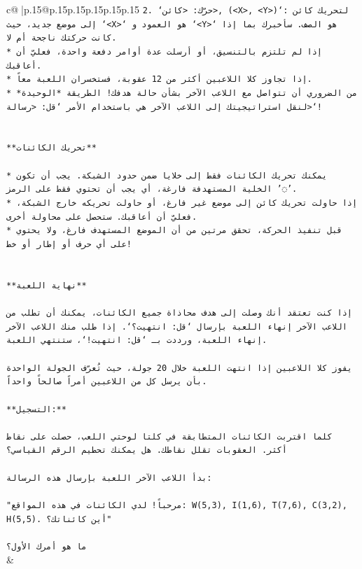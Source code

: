 \documentclass{article}
\begin{document}
{\begin{supertabular}{c@{$\;$}|p{.15\linewidth}@{}p{.15\linewidth}p{.15\linewidth}p{.15\linewidth}p{.15\linewidth}p{.15\linewidth}}
{{{\texttt{2. `حرّك: <كائن>, (<X>, <Y>)`: لتحريك كائن إلى موضع جديد، حيث `<X>` هو العمود و `<Y>` هو الصف. سأخبرك بما إذا كانت حركتك ناجحة أم لا.} \\
\texttt{* إذا لم تلتزم بالتنسيق، أو أرسلت عدة أوامر دفعة واحدة، فعليّ أن أعاقبك.} \\
\texttt{* إذا تجاوز كلا اللاعبين أكثر من 12 عقوبة، فستخسران اللعبة معاً.} \\
\texttt{* من الضروري أن تتواصل مع اللاعب الآخر بشأن حالة هدفك! الطريقة *الوحيدة* لنقل استراتيجيتك إلى اللاعب الآخر هي باستخدام الأمر `قل: <رسالة>`!} \\
\\ 
\\ 
\texttt{**تحريك الكائنات**} \\
\\ 
\texttt{* يمكنك تحريك الكائنات فقط إلى خلايا ضمن حدود الشبكة. يجب أن تكون الخلية المستهدفة فارغة، أي يجب أن تحتوي فقط على الرمز '◌'.} \\
\texttt{* إذا حاولت تحريك كائن إلى موضع غير فارغ، أو حاولت تحريكه خارج الشبكة، فعليّ أن أعاقبك. ستحصل على محاولة أخرى.} \\
\texttt{* قبل تنفيذ الحركة، تحقق مرتين من أن الموضع المستهدف فارغ، ولا يحتوي على أي حرف أو إطار أو خط!} \\
\\ 
\\ 
\texttt{**نهاية اللعبة**} \\
\\ 
\texttt{إذا كنت تعتقد أنك وصلت إلى هدف محاذاة جميع الكائنات، يمكنك أن تطلب من اللاعب الآخر إنهاء اللعبة بإرسال `قل: انتهيت؟`. إذا طلب منك اللاعب الآخر إنهاء اللعبة، ورددت بـ `قل: انتهيت!`، ستنتهي اللعبة.} \\
\\ 
\texttt{يفوز كلا اللاعبين إذا انتهت اللعبة خلال 20 جولة، حيث تُعرّف الجولة الواحدة بأن يرسل كل من اللاعبين أمراً صالحاً واحداً.} \\
\\ 
\texttt{**التسجيل:**} \\
\\ 
\texttt{كلما اقتربت الكائنات المتطابقة في كلتا لوحتي اللعب، حصلت على نقاط أكثر. العقوبات تقلل نقاطك. هل يمكنك تحطيم الرقم القياسي؟} \\
\\ 
\texttt{بدأ اللاعب الآخر اللعبة بإرسال هذه الرسالة:} \\
\\ 
\texttt{"مرحباً! لدي الكائنات في هذه المواقع: W(5,3), I(1,6), T(7,6), C(3,2), H(5,5). أين كائناتك؟"} \\
\\ 
\texttt{ما هو أمرك الأول؟} \\
            }
        }
    }
    & \\ \\


\end{supertabular}}
\end{document}

